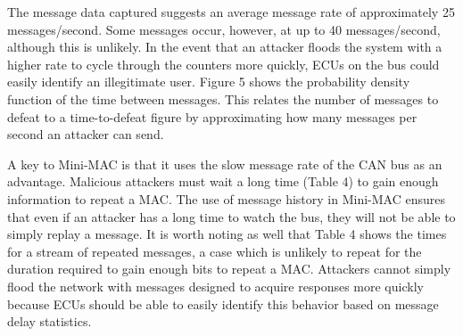 The message data captured suggests an average message rate of approximately 25 messages/second. Some messages occur, however, at up to 40 messages/second, although this is unlikely. In the event that an attacker floods the system with a higher rate to cycle through the counters more quickly, ECUs on the bus could easily identify an illegitimate user. Figure 5 shows the probability density function of the time between messages. This relates the number of messages to defeat to a time-to-defeat figure by approximating how many messages per second an attacker can send.



A key to Mini-MAC is that it uses the slow message rate of the CAN bus as an advantage. Malicious attackers must wait a long time (Table 4) to gain enough information to repeat a MAC. The use of message history in Mini-MAC ensures that even if an attacker has a long time to watch the bus, they will not be able to simply replay a message. It is worth noting as well that Table 4 shows the times for a stream of repeated messages, a case which is unlikely to repeat for the duration required to gain enough bits to repeat a MAC. Attackers cannot simply flood the network with messages designed to acquire responses more quickly because ECUs should be able to easily identify this behavior based on message delay statistics.

